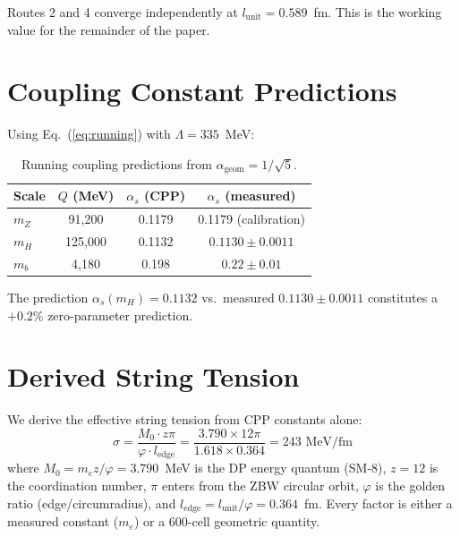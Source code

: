 \documentclass[12pt,a4paper]{article}
\begin{document}
Routes 2 and 4 converge independently at $l_{\mathrm{unit}} = 0.589$~fm. This is the working value for the remainder of the paper.

\section{Coupling Constant Predictions}

Using Eq.~(\ref{eq:running}) with $\Lambda = 335$~MeV:

\begin{table}[h]
\centering
\caption{Running coupling predictions from $\alpha_{\mathrm{geom}} = 1/\sqrt{5}$.}
\label{tab:alphas}
\begin{tabular}{lccc}
\toprule
Scale & $Q$ (MeV) & $\alpha_s$ (CPP) & $\alpha_s$ (measured) \\
\midrule
$m_Z$ & 91,200 & 0.1179 & 0.1179 (calibration) \\
$m_H$ & 125,000 & 0.1132 & $0.1130 \pm 0.0011$ \\
$m_b$ & 4,180 & 0.198 & $0.22 \pm 0.01$ \\
\bottomrule
\end{tabular}
\end{table}

The prediction $\alpha_s(m_H) = 0.1132$ vs.\ measured $0.1130 \pm 0.0011$ constitutes a $+0.2\%$ zero-parameter prediction.

\section{Derived String Tension}
\label{sec:sigma}

We derive the effective string tension from CPP constants alone:
\begin{equation}
\boxed{\sigma = \frac{M_0 \cdot z\pi}{\varphi \cdot l_{\mathrm{edge}}} = \frac{3.790 \times 12\pi}{1.618 \times 0.364} = 243 \text{ MeV/fm}}
\label{eq:sigma}
\end{equation}
where $M_0 = m_e z/\varphi = 3.790$~MeV is the DP energy quantum (SM-8), $z = 12$ is the coordination number, $\pi$ enters from the ZBW circular orbit, $\varphi$ is the golden ratio (edge/circumradius), and $l_{\mathrm{edge}} = l_{\mathrm{unit}}/\varphi = 0.364$~fm. Every factor is either a measured constant ($m_e$) or a 600-cell geometric quantity.
\end{document}
